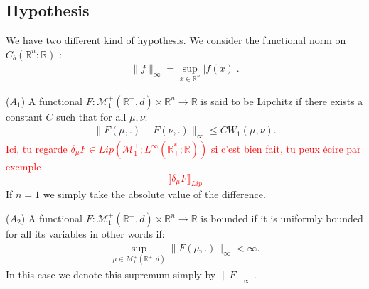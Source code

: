 \documentclass[11pt,a4paper]{article}
\newcommand{\RR}{\mathbb{R}}
\newcommand{\MC}{\mathcal{M}}
\newcommand{\red}[1]{\textcolor{red}{#1}}
\begin{document}
\subsection{Hypothesis}
We have two different kind of hypothesis. We consider the functional norm on $C_b\left(\RR^n:\RR\right)$ :
\begin{align*}
    \| f\|_{\infty} = \sup\limits_{x \in \RR^n} |f(x)|.
\end{align*}

($A_1$) A functional $F : \MC_1^+(\RR^+,d)\times \RR^n \to \RR$ is said to be Lipchitz if there exists a constant $C$ such that for all $\mu,\nu$:
\begin{align*}
    \|F(\mu,.) - F(\nu,.)\|_{\infty} \leq C W_1(\mu,\nu).
\end{align*}
\red{ Ici, tu regarde $\delta_\mu F \in Lip(\MC^+_1;L^\infty(\mathbb{R}_+^*;\mathbb{R}))$ si c'est bien fait, tu peux écire par exemple
\[\llbracket \delta_\mu F\rrbracket_{Lip} \]}
If $n = 1$ we simply take the absolute value of the difference.

($A_2$) A functional $F : \MC_1^+(\RR^+,d)\times \RR^n \to \RR$ is bounded if it is uniformly bounded for all its variables in other words if:
\begin{align*}
    \sup\limits_{\mu \in \MC_1^+(\RR^+,d)}\|F(\mu,.) \|_{\infty} < \infty. 
\end{align*}
In this case we denote this supremum simply by $\|F\|_{\infty}$.
\end{document}

